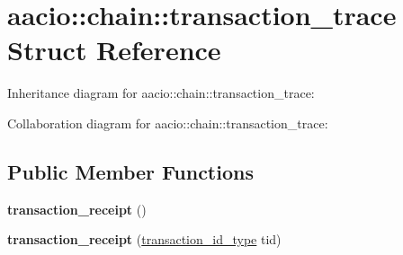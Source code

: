\hypertarget{structaacio_1_1chain_1_1transaction__trace}{}\section{aacio\+:\+:chain\+:\+:transaction\+\_\+trace Struct Reference}
\label{structaacio_1_1chain_1_1transaction__trace}


Inheritance diagram for aacio\+:\+:chain\+:\+:transaction\+\_\+trace\+:


Collaboration diagram for aacio\+:\+:chain\+:\+:transaction\+\_\+trace\+:
\subsection*{Public Member Functions}
\begin{DoxyCompactItemize}
\item 
\mbox{\label{structaacio_1_1chain_1_1transaction__trace_a7c3b357705a99969e9cd9ff54891d63c}} 
{\bfseries transaction\+\_\+receipt} ()
\item 
\mbox{\label{structaacio_1_1chain_1_1transaction__trace_a22908355ddebe9a88bb8a1ed1d61fb9f}} 
{\bfseries transaction\+\_\+receipt} (\mbox{\hyperlink{classfc_1_1sha256}{transaction\+\_\+id\+\_\+type}} tid)
\end{DoxyCompactItemize}
